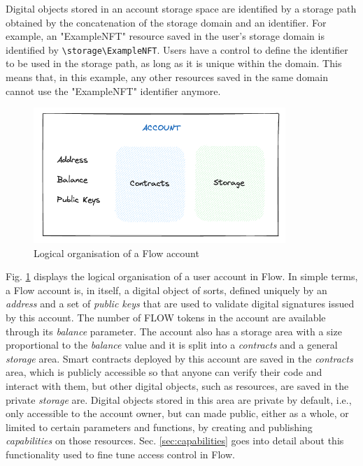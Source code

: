 \documentclass[../main.tex]{subfiles}
\begin{document}
Digital objects stored in an account storage space are identified by a storage path obtained by the concatenation of the storage domain and an identifier. For example, an "ExampleNFT" resource saved in the user's storage domain is identified by \verb|\storage\ExampleNFT|. Users have a control to define the identifier to be used in the storage path, as long as it is unique within the domain. This means that, in this example, any other resources saved in the same domain cannot use the "ExampleNFT" identifier anymore.

\begin{figure}[htp]
    \centering
    \includegraphics[width=0.85\textwidth]{../Images/08_Flow_Account_Storage_Arch.png}
    \caption{Logical organisation of a Flow account \cite{Cadence2024}}
    \label{fig:flow_account}
\end{figure}

Fig. \ref{fig:flow_account} displays the logical organisation of a user account in Flow. In simple terms, a Flow account is, in itself, a digital object of sorts, defined uniquely by an \textit{address} and a set of \textit{public keys} that are used to validate digital signatures issued by this account. The number of FLOW tokens in the account are available through its \textit{balance} parameter. The account also has a storage area with a size proportional to the \textit{balance} value and it is split into a \textit{contracts} and a general \textit{storage} area. Smart contracts deployed by this account are saved in the \textit{contracts} area, which is publicly accessible so that anyone can verify their code and interact with them, but other digital objects, such as resources, are saved in the private \textit{storage} are. Digital objects stored in this area are private by default, i.e., only accessible to the account owner, but can made public, either as a whole, or limited to certain parameters and functions, by creating and publishing \textit{capabilities} on those resources. Sec. \ref{sec:capabilities} goes into detail about this functionality used to fine tune access control in Flow.
\end{document}
